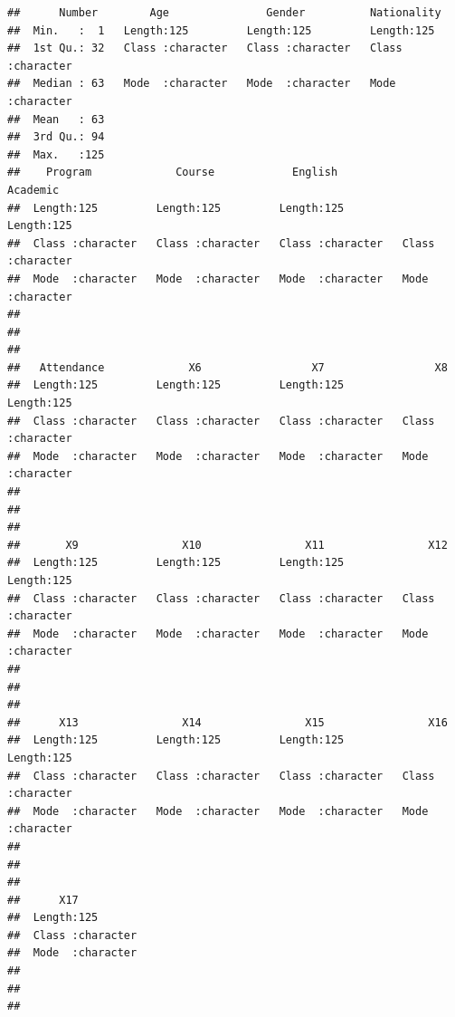 \documentclass[
]{article}
\begin{document}
\begin{verbatim}
##      Number        Age               Gender          Nationality       
##  Min.   :  1   Length:125         Length:125         Length:125        
##  1st Qu.: 32   Class :character   Class :character   Class :character  
##  Median : 63   Mode  :character   Mode  :character   Mode  :character  
##  Mean   : 63                                                           
##  3rd Qu.: 94                                                           
##  Max.   :125                                                           
##    Program             Course            English            Academic        
##  Length:125         Length:125         Length:125         Length:125        
##  Class :character   Class :character   Class :character   Class :character  
##  Mode  :character   Mode  :character   Mode  :character   Mode  :character  
##                                                                             
##                                                                             
##                                                                             
##   Attendance             X6                 X7                 X8           
##  Length:125         Length:125         Length:125         Length:125        
##  Class :character   Class :character   Class :character   Class :character  
##  Mode  :character   Mode  :character   Mode  :character   Mode  :character  
##                                                                             
##                                                                             
##                                                                             
##       X9                X10                X11                X12           
##  Length:125         Length:125         Length:125         Length:125        
##  Class :character   Class :character   Class :character   Class :character  
##  Mode  :character   Mode  :character   Mode  :character   Mode  :character  
##                                                                             
##                                                                             
##                                                                             
##      X13                X14                X15                X16           
##  Length:125         Length:125         Length:125         Length:125        
##  Class :character   Class :character   Class :character   Class :character  
##  Mode  :character   Mode  :character   Mode  :character   Mode  :character  
##                                                                             
##                                                                             
##                                                                             
##      X17           
##  Length:125        
##  Class :character  
##  Mode  :character  
##                    
##                    
## 
\end{verbatim}
\end{document}
